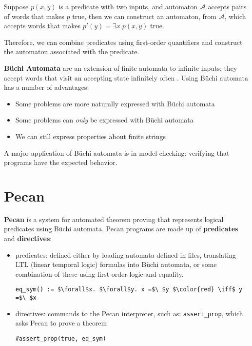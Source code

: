 \documentclass[10pt,usenames,dvipsnames]{article}
\begin{document}
\begin{theorem}\cite{aut_theory}
    Suppose $p(x,y)$ is a predicate with two inputs, and automaton $\mathcal{A}$ accepts pairs of words that makes $p$ true, then we can construct an automaton, from $\mathcal{A}$, which accepts words that makes $p'(y) = \exists x. p(x,y)$ true.
\end{theorem}

Therefore, we can combine predicates using first-order quantifiers and construct the automaton associated with the predicate.

\textbf{B\"uchi Automata} are an extension of finite automata to infinite inputs; they accept words that visit an accepting state infinitely often \cite{aut_theory}. 
Using B\"uchi automata has a number of advantages:
\begin{itemize}
        \item Some problems are more naturally expressed with B\"uchi automata
        \item Some problems can \emph{only} be expressed with B\"uchi automata
        \item We can still express properties about finite strings
\end{itemize}
A major application of B\"uchi automata is in model checking: verifying that programs have the expected behavior.

\section{Pecan}

\textbf{Pecan} is a system for automated theorem proving that represents logical predicates using B\"uchi automata.
Pecan programs are made up of \textbf{predicates} and \textbf{directives}:

\begin{itemize}
    \item predicates: defined either by loading automata defined in files, translating LTL (linear temporal logic) formulas into B\"uchi automata, or some combination of these using first order logic and equality.

\begin{lstlisting}[language=pecan, basicstyle=\normalsize\ttfamily, mathescape=true, frame=single]
eq_sym() := $\forall$x. $\forall$y. x =$\ $y $\color{red} \iff$ y =$\ $x
\end{lstlisting}

    \item directives: commands to the Pecan interpreter, such as: \texttt{assert\_prop}, which asks Pecan to prove a theorem
    
\begin{lstlisting}[language=pecan, basicstyle=\normalsize\ttfamily, mathescape=true, frame=single]
#assert_prop(true, eq_sym)
\end{lstlisting}

\end{itemize}
\end{document}
